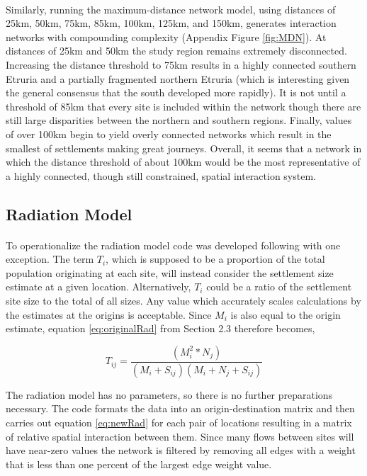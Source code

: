 \documentclass[12pt,a4paper]{thesis}
\begin{document}
\paragraph{}
Similarly, running the maximum-distance network model, using distances of 25km, 50km, 75km, 85km, 100km, 125km, and 150km, generates interaction networks with compounding complexity (Appendix Figure \ref{fig:MDN}). At distances of 25km and 50km the study region remains extremely disconnected. Increasing the distance threshold to 75km results in a highly connected southern Etruria and a partially fragmented northern Etruria (which is interesting given the general consensus that the south developed more rapidly). It is not until a threshold of 85km that every site is included within the network though there are still large disparities between the northern and southern regions. Finally, values of over 100km begin to yield overly connected networks which result in the smallest of settlements making great journeys. Overall, it seems that a network in which the distance threshold of about 100km would be the most representative of a highly connected, though still constrained, spatial interaction system.  



\subsection{Radiation Model}
\paragraph{}
To operationalize the radiation model code was developed following \cite{Bar12} with one exception. The term  $T_{i}$, which is supposed to be a proportion of the total population originating at each site, will instead consider the settlement size estimate at a given location. Alternatively, $T_{i}$ could be a ratio of the settlement site size to the total of all sizes. Any value which accurately scales calculations by the estimates at the origins is acceptable. Since $M_{i}$ is also equal to the origin estimate, equation \ref{eq:originalRad} from Section 2.3 therefore becomes,
						
				
				\begin{equation}						
				T_{ij} = \frac{(M_{i}^2*N_{j})}{(M_{i}+S_{ij})(M_{i}+N_{j}+S_{ij})}
				\label{eq:newRad}	
				\end{equation}
						
The radiation model has no parameters, so there is no further preparations necessary. The code formats the data into an origin-destination matrix and then  carries out equation \ref{eq:newRad} for each pair of locations resulting in a matrix of relative spatial interaction between them. Since many flows between sites will have near-zero values the network is filtered by removing all edges with a weight that is less than one percent of the largest edge weight value. 
\end{document}
